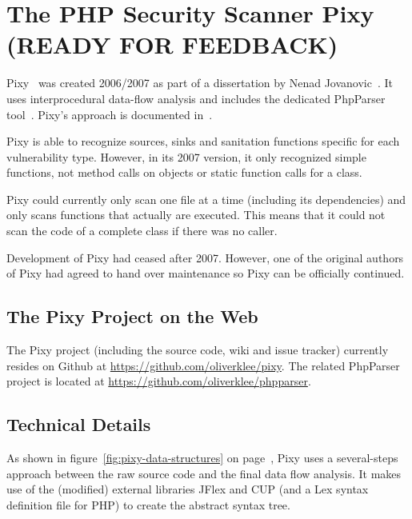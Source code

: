 \chapter{The PHP Security Scanner Pixy (READY FOR FEEDBACK)}
\label{pixy}
Pixy~\cite{pixy} was created 2006/2007 as part of a dissertation by Nenad Jovanovic~\cite{pixy-dissertation}. It uses interprocedural data-flow analysis and includes the dedicated PhpParser tool~\cite{phpparser}. Pixy's approach is documented in~\cite{pixy-short, pixy-long, pixy-technical, pixy-dissertation}.

Pixy is able to recognize sources, sinks and sanitation functions specific for each vulnerability type. However, in its 2007 version, it only recognized simple functions, not method calls on objects or static function calls for a class.

Pixy could currently only scan one file at a time (including its dependencies) and only scans functions that actually are executed. This means that it could not scan the code of a complete class if there was no caller.

Development of Pixy had ceased after 2007. However, one of the original authors of Pixy had agreed to hand over maintenance so Pixy can be officially continued.

\section{The Pixy Project on the Web}

The Pixy project (including the source code, wiki and issue tracker) currently resides on Github at \url{https://github.com/oliverklee/pixy}. The related PhpParser project is located at \url{https://github.com/oliverklee/phpparser}.

\section{Technical Details}

As shown in figure~\ref{fig:pixy-data-structures} on page~\pageref{fig:pixy-data-structures}, Pixy uses a several-steps approach between the raw source code and the final data flow analysis. It makes use of the (modified) external libraries JFlex and CUP (and a Lex syntax definition file for PHP) to create the abstract syntax tree.

